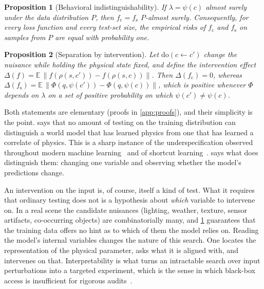\documentclass[11pt]{article}
\newtheorem{proposition}{Proposition}
\theoremstyle{definition}\newtheorem{definition}{Definition}
\newcommand{\E}{\mathbb{E}}
\begin{document}
\begin{proposition}[Behavioral indistinguishability]\label{prop:indist}
If $\lambda=\psi(c)$ almost surely under the data distribution $P$, then $f_{\mathrm c}=f_{\mathrm s}$ $P$-almost surely. Consequently, for every loss function and every test-set size, the empirical risks of $f_{\mathrm c}$ and $f_{\mathrm s}$ on samples from $P$ are equal with probability one.
\end{proposition}

\begin{proposition}[Separation by intervention]\label{prop:sep}
Let $\mathrm{do}(c\!\leftarrow\!c')$ change the nuisance while holding the physical state fixed, and define the intervention effect $\Delta(f)=\E\,\|f(\rho(s,c'))-f(\rho(s,c))\|$. Then $\Delta(f_{\mathrm c})=0$, whereas $\Delta(f_{\mathrm s})=\E\,\|\Phi(q,\psi(c'))-\Phi(q,\psi(c))\|$, which is positive whenever $\Phi$ depends on $\lambda$ on a set of positive probability on which $\psi(c')\neq\psi(c)$.
\end{proposition}

Both statements are elementary (proofs in \cref{app:proofs}), and their simplicity is the point.  says that no amount of testing on the training distribution can distinguish a world model that has learned physics from one that has learned a correlate of physics. This is a sharp instance of the underspecification observed throughout modern machine learning~\citep{damour2022underspecification} and of shortcut learning~\citep{geirhos2020shortcut}.  says what does distinguish them: changing one variable and observing whether the model's predictions change.

An intervention on the input is, of course, itself a kind of test. What it requires that ordinary testing does not is a hypothesis about \emph{which} variable to intervene on. In a real scene the candidate nuisances (lighting, weather, texture, sensor artifacts, co-occurring objects) are combinatorially many, and \cref{prop:indist} guarantees that the training data offers no hint as to which of them the model relies on. Reading the model's internal variables changes the nature of this search. One locates the representation of the physical parameter, asks what it is aligned with, and intervenes on that. Interpretability is what turns an intractable search over input perturbations into a targeted experiment, which is the sense in which black-box access is insufficient for rigorous audits~\citep{casper2024blackbox}.
\end{document}

